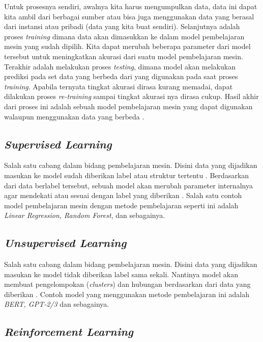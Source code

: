 Untuk prosesnya sendiri, awalnya kita harus mengumpulkan data, data ini dapat kita ambil dari  berbagai sumber atau bisa juga menggunakan data yang berasal dari instansi atau pribadi (data yang kita buat sendiri). Selanjutnya adalah proses \textit{training} dimana data akan dimasukkan ke dalam model pembelajaran mesin yang sudah dipilih. Kita dapat merubah beberapa parameter dari model tersebut untuk meningkatkan akurasi dari suatu model pembelajaran mesin. Terakhir adalah melakukan proses \textit{testing}, dimana model akan melakukan prediksi pada set data yang berbeda dari yang digunakan pada saat proses \textit{training}. Apabila ternyata tingkat akurasi dirasa kurang memadai, dapat dilakukan proses \textit{re-training} sampai tingkat akurasi nya dirasa cukup. Hasil akhir dari proses ini adalah sebuah model pembelajaran mesin yang dapat digunakan walaupun menggunakan data yang berbeda \cite{mit_ml_expl}.

\subsection{\textit{Supervised Learning}}

Salah satu cabang dalam bidang pembelajaran mesin. Disini data yang dijadikan masukan ke model sudah diberikan label atau struktur tertentu \cite{ms_ml_expl}. Berdasarkan dari data berlabel tersebut, sebuah model akan merubah parameter internalnya agar mendekati atau sesuai dengan label yang diberikan \cite{ibm_ml_expl}. Salah satu contoh model pembelajaran mesin dengan metode pembelajaran seperti ini adalah \textit{Linear Regression, Random Forest}, dan sebagainya.

\subsection{\textit{Unsupervised Learning}}

Salah satu cabang dalam bidang pembelajaran mesin. Disini data yang dijadikan masukan ke model tidak diberikan label sama sekali. Nantinya model akan membuat pengelompokan (\textit{clusters}) dan hubungan berdasarkan dari data yang diberikan \cite{mit_ml_expl}. Contoh model yang menggunakan metode pembelajaran ini adalah \textit{BERT, GPT-2/3} dan sebagainya.

\subsection{\textit{Reinforcement Learning}}

